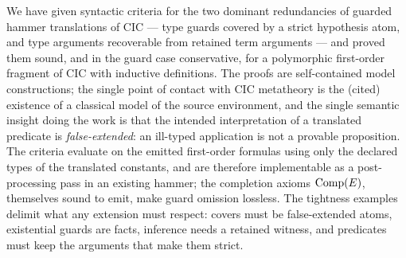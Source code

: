 We have given syntactic criteria for the two dominant redundancies of
guarded hammer translations of CIC --- type guards covered by a strict
hypothesis atom, and type arguments recoverable from retained term
arguments --- and proved them sound, and in the guard case conservative,
for a polymorphic first-order fragment of CIC with inductive definitions.
The proofs are self-contained model constructions; the single point of
contact with CIC metatheory is the (cited) existence of a classical model
of the source environment, and the single semantic insight doing the work
is that the intended interpretation of a translated predicate is
\emph{false-extended}: an ill-typed application is not a provable
proposition.  The criteria evaluate on the emitted first-order formulas
using only the declared types of the translated constants, and are
therefore implementable as a post-processing pass in an existing hammer;
the completion axioms $\mathrm{Comp}(E)$, themselves sound to emit, make guard
omission lossless.  The tightness examples delimit what any extension
must respect: covers must be false-extended atoms, existential guards are
facts, inference needs a retained witness, and predicates must keep the
arguments that make them strict.
